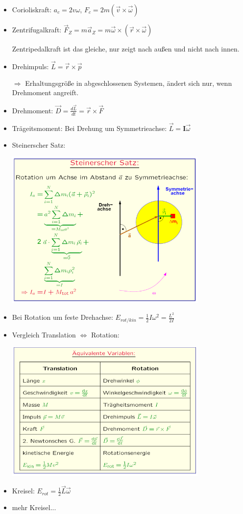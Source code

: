 \documentclass[a4paper,10pt, fleqn]{article}
\begin{document}
\begin{itemize}
\item Corioliskraft: $a_c = 2v\omega$, $F_c = 2m (\vec{v} \times \vec{\omega})$
\item Zentrifugalkraft: $\vec{F}_Z = m \vec{a}_Z = m \vec{\omega} \times (\vec{r}\times \vec{\omega})$

  Zentripedalkraft ist das gleiche, nur zeigt nach außen und nicht nach innen.
\item Drehimpuls: $\vec{L} = \vec{r} \times \vec{p}$

  $\Rightarrow$ Erhaltungsgröße in abgeschlossenen Systemen, ändert sich nur, wenn Drehmoment angreift.
\item Drehmoment: $\vec{D} = \frac{d\vec{L}}{dt} = \vec{r} \times \vec{F}$
\item Trägeitsmoment: Bei Drehung um Symmetrieachse: $\vec{L} = \mathbf{I}\vec{\omega}$
\item Steinerscher Satz:

  \includegraphics[width=10cm]{SteinerscherSatz}
\item Bei Rotation um feste Drehachse: $E_{rot/kin} = \frac{1}{2}I\omega^2 = \frac{L^2}{2I}$
\item Vergleich Translation $\Leftrightarrow$ Rotation:

  \includegraphics[width=10cm]{TranslationVsRotation}
\item Kreisel: $E_{rot} = \frac{1}{2}\vec{L}\vec{\omega}$
\item mehr Kreisel...
\end{itemize}
\end{document}
